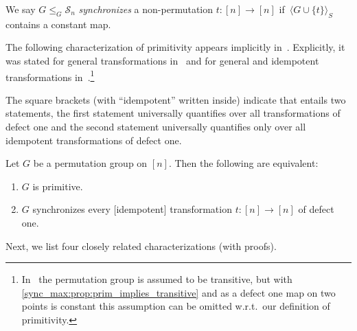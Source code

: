 
\label{def:group-sync-trans}

We say $G \le_G \mathcal S_n$ \emph{synchronizes}
a non-permutation $t \colon [n] \to [n]$ if~$\langle G \cup \{t\} \rangle_S$
contains a constant map.

The following characterization of primitivity 
appears implicitly in~\cite{Rystsov2000}.
Explicitly, it was stated 
for general transformations in~\cite[Thm.~1]{AraujoCameron2014}
and for general and idempotent
transformations in~\cite[Thm.~8.1]{ArCamSt2017}.\footnote{In~\cite[Thm.~8.1]{ArCamSt2017} the permutation group is assumed
	to be transitive, but with \cref{sync_max:prop:prim_implies_transitive}
	and as a defect one map on two points is constant this assumption can be omitted w.r.t.~our definition of primitivity.} 

\begin{remark} \label{syncmax:rem:square-brackets}
The square brackets (with ``idempotent'' written inside) 
indicate that   entails 
two statements, the first statement
universally quantifies over all transformations of defect one and the second statement universally quantifies only
over all idempotent transformations of defect one.
\end{remark} 

\begin{theorem}
	\label{sync_max:thm:prim_rystsov}
	Let $G$ be a permutation group on $[n]$.
	Then the following are equivalent:
	\begin{enumerate}
		\item $G$ is primitive.
		
		\item \label{sync_max:thm:prim_rystsov:2} $G$ synchronizes every [idempotent] transformation $t \colon [n] \to [n]$ 
		of defect one.
	\end{enumerate}	
\end{theorem} 

Next, we list four closely related characterizations (with proofs).

